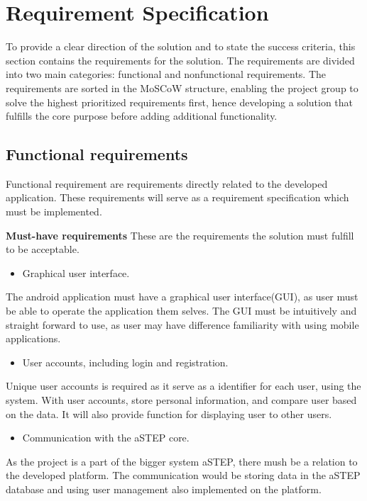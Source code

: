 \section{Requirement Specification}
To provide a clear direction of the solution and to state the success criteria, this section contains the requirements for the solution. The requirements are divided into two main categories: functional and nonfunctional requirements. The requirements are sorted in the MoSCoW structure, enabling the project group to solve the highest prioritized requirements first, hence developing a solution that fulfills the core purpose before adding additional functionality.


\subsection{Functional requirements}
Functional requirement are requirements directly related to the developed application. These requirements will serve as a requirement specification which must be implemented.

\textbf{Must-have requirements}
These are the requirements the solution must fulfill to be acceptable.

\begin{itemize}
	\item Graphical user interface.
\end{itemize}
The android application must have a graphical user interface(GUI), as user must be able to operate the application them selves. The GUI must be intuitively and straight forward to use, as user may have difference familiarity with using mobile applications.

\begin{itemize}
	\item User accounts, including login and registration.
\end{itemize}
Unique user accounts is required as it serve as a identifier for each user, using the system. With user accounts, store personal information, and compare user based on the data. It will also provide function for displaying user to other users.

\begin{itemize}
	\item Communication with the aSTEP core.
\end{itemize}
As the project is a part of the bigger system aSTEP, there mush be a relation to the developed platform. The communication would be storing data in the aSTEP database and using user management also implemented on the platform.

